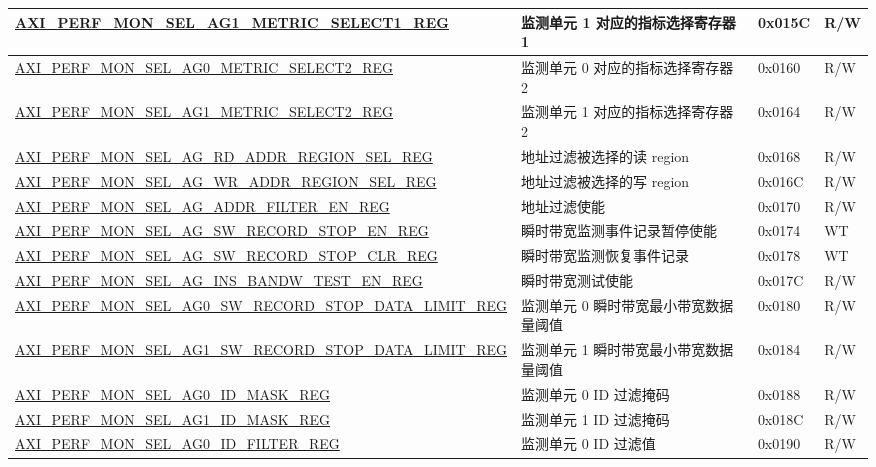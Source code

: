 \begin{longtable}{ | p{9.1cm} | p{5cm} | p{1.3cm} | p{1.3cm} | }
\hyperref[regdesc:AXIPERFMONSELAGNMETRICSELECTMREG]{AXI\_PERF\_MON\_SEL\_AG1\_METRIC\_SELECT1\_REG} & 监测单元 1 对应的指标选择寄存器 1 & 0x015C & R/W\\ \hline
\hyperref[regdesc:AXIPERFMONSELAGNMETRICSELECTMREG]{AXI\_PERF\_MON\_SEL\_AG0\_METRIC\_SELECT2\_REG} & 监测单元 0 对应的指标选择寄存器 2 & 0x0160 & R/W\\ \hline
\hyperref[regdesc:AXIPERFMONSELAGNMETRICSELECTMREG]{AXI\_PERF\_MON\_SEL\_AG1\_METRIC\_SELECT2\_REG} & 监测单元 1 对应的指标选择寄存器 2 & 0x0164 & R/W\\ \hline
\hyperref[regdesc:AXIPERFMONSELAGRDADDRREGIONSELREG]{AXI\_PERF\_MON\_SEL\_AG\_RD\_ADDR\_REGION\_SEL\_REG} & 地址过滤被选择的读 region & 0x0168 & R/W\\ \hline
\hyperref[regdesc:AXIPERFMONSELAGWRADDRREGIONSELREG]{AXI\_PERF\_MON\_SEL\_AG\_WR\_ADDR\_REGION\_SEL\_REG} & 地址过滤被选择的写 region & 0x016C & R/W\\ \hline
\hyperref[regdesc:AXIPERFMONSELAGADDRFILTERENREG]{AXI\_PERF\_MON\_SEL\_AG\_ADDR\_FILTER\_EN\_REG} & 地址过滤使能 & 0x0170 & R/W\\ \hline
\hyperref[regdesc:AXIPERFMONSELAGSWRECORDSTOPENREG]{AXI\_PERF\_MON\_SEL\_AG\_SW\_RECORD\_STOP\_EN\_REG} & 瞬时带宽监测事件记录暂停使能 & 0x0174 & WT\\ \hline
\hyperref[regdesc:AXIPERFMONSELAGSWRECORDSTOPCLRREG]{AXI\_PERF\_MON\_SEL\_AG\_SW\_RECORD\_STOP\_CLR\_REG} & 瞬时带宽监测恢复事件记录 & 0x0178 & WT\\ \hline
\hyperref[regdesc:AXIPERFMONSELAGINSBANDWTESTENREG]{AXI\_PERF\_MON\_SEL\_AG\_INS\_BANDW\_TEST\_EN\_REG} & 瞬时带宽测试使能 & 0x017C & R/W\\ \hline
\hyperref[regdesc:AXIPERFMONSELAGNSWRECORDSTOPDATALIMITREG]{AXI\_\-PERF\_\-MON\_\-SEL\_\-AG0\_\-SW\_\-RECORD\_\-STOP\_\-DATA\_\-LIMIT\_\-REG} & 监测单元 0 瞬时带宽最小带宽数据量阈值 & 0x0180 & R/W\\ \hline
\hyperref[regdesc:AXIPERFMONSELAGNSWRECORDSTOPDATALIMITREG]{AXI\_\-PERF\_\-MON\_\-SEL\_\-AG1\_\-SW\_\-RECORD\_\-STOP\_\-DATA\_\-LIMIT\_\-REG} & 监测单元 1 瞬时带宽最小带宽数据量阈值 & 0x0184 & R/W\\ \hline
\hyperref[regdesc:AXIPERFMONSELAGNIDMASKREG]{AXI\_PERF\_MON\_SEL\_AG0\_ID\_MASK\_REG} & 监测单元 0 ID 过滤掩码 & 0x0188 & R/W\\ \hline
\hyperref[regdesc:AXIPERFMONSELAGNIDMASKREG]{AXI\_PERF\_MON\_SEL\_AG1\_ID\_MASK\_REG} & 监测单元 1 ID 过滤掩码 & 0x018C & R/W\\ \hline
\hyperref[regdesc:AXIPERFMONSELAGNIDFILTERREG]{AXI\_PERF\_MON\_SEL\_AG0\_ID\_FILTER\_REG} & 监测单元 0 ID 过滤值 & 0x0190 & R/W\\ \hline

\end{longtable}
